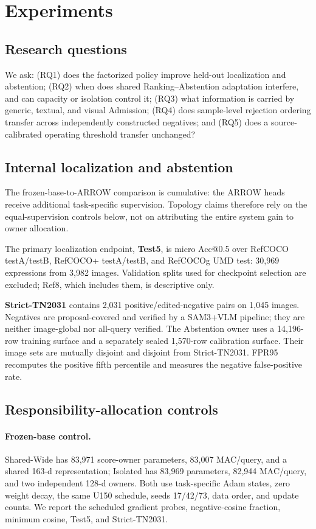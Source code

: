 \section{Experiments}
\label{sec:experiments}

\subsection{Research questions}
We ask: (RQ1) does the factorized policy improve held-out localization and
abstention; (RQ2) when does shared Ranking--Abstention adaptation interfere,
and can capacity or isolation control it; (RQ3) what information is carried by
generic, textual, and visual Admission; (RQ4) does sample-level rejection
ordering transfer across independently constructed negatives; and (RQ5) does a
source-calibrated operating threshold transfer unchanged?

\subsection{Internal localization and abstention}
The frozen-base-to-ARROW comparison is cumulative: the ARROW heads receive
additional task-specific supervision.  Topology claims therefore rely on the
equal-supervision controls below, not on attributing the entire system gain to
owner allocation.

The primary localization endpoint, \textbf{Test5}, is micro Acc@0.5 over
RefCOCO testA/testB, RefCOCO+ testA/testB, and RefCOCOg UMD test: 30,969
expressions from 3,982 images.  Validation splits used for checkpoint selection
are excluded; Ref8, which includes them, is descriptive only.

\textbf{Strict-TN2031} contains 2,031 positive/edited-negative pairs on 1,045
images.  Negatives are proposal-covered and verified by a SAM3+VLM pipeline;
they are neither image-global nor all-query verified.  The Abstention owner
uses a 14,196-row training surface and a separately sealed 1,570-row
calibration surface.  Their image sets are mutually disjoint and disjoint from
Strict-TN2031.  FPR95 recomputes the positive fifth percentile and measures the
negative false-positive rate.

\subsection{Responsibility-allocation controls}
\paragraph{Frozen-base control.}
Shared-Wide has 83,971 score-owner parameters, 83,007 MAC/query, and a shared
163-d representation; Isolated has 83,969 parameters, 82,944 MAC/query, and two
independent 128-d owners.  Both use task-specific Adam states, zero weight
decay, the same U150 schedule, seeds 17/42/73, data order, and update counts.
We report the scheduled gradient probes, negative-cosine fraction, minimum
cosine, Test5, and Strict-TN2031.

